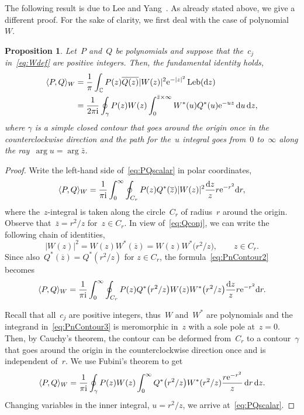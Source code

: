 \documentclass[pdftex]{sigma}
\numberwithin{equation}{section}
\newtheorem{Proposition}[Theorem]{Proposition}
\DeclareMathOperator{\Leb}{Leb}
\newcommand*{\Cset}{\mathbb{C}} %
\begin{document}
 The following result is due to Lee and Yang~\cite[Proposition 1]{LY2}. As already stated above, we give a different proof. For the sake of clarity, we first deal with the case of polynomial~$W$.

 \begin{Proposition}
 \label{prop:Contour1}
 Let~$P$ and~$Q$ be polynomials and suppose that the~$c_j$ in~\eqref{eq:Wdef} are positive integers.
 Then, the fundamental identity holds,
 \begin{align}
 \langle P, Q \rangle_W &= \frac{1}{\pi} \int_{\Cset} P(z) \overline{Q(z)} |W(z)|^2 {\rm e}^{-|z|^2} \Leb({\rm d}z)\nonumber \\
 & = \frac{1}{2\pi {\rm i}} \oint_{\gamma} P(z) W(z) \int_{0}^{\bar{z} \times \infty} W^*(u) Q^*(u) {\rm e}^{-uz}\, {\rm d}u\, {\rm d}z, \label{eq:PQscalar}
 \end{align}
 where $\gamma$ is a simple closed contour that goes around the origin once in the counterclockwise direction and the path for the~$u$ integral goes from~$0$ to~$\infty$ along the ray~$\arg u = \arg \bar{z}$.
 \end{Proposition}
 \begin{proof}
 Write the left-hand side of~\eqref{eq:PQscalar} in polar coordinates,
 \begin{equation}
 \label{eq:PnContour2}
 \langle P, Q\rangle_W =\frac{1}{\pi {\rm i}} \int_0^\infty \oint_{C_r} P(z) Q^*(\overline{z}) |W(z)|^2 \frac{{\rm d}z}{z} r {\rm e}^{-r^2} {\rm d}r,
 \end{equation}
 where the~$z$-integral is taken along the circle~$C_r$ of radius~$r$ around the origin. Observe that~$\overline{z} = r^2/z$ for~$z \in C_r$. In view of~\eqref{eq:Qconj}, we can write the following chain of identities,
 \begin{equation*}
 |W(z)|^2 = W(z) W^*(\overline{z}) = W(z) W^*\big(r^2/z\big), \qquad z \in C_r.
 \end{equation*}
 Since also~$Q^*(\overline{z}) = Q^*(r^2/z)$ for $z \in C_r$, the formula~\eqref{eq:PnContour2} becomes
 \begin{equation}
 \label{eq:PnContour3}
 \langle P, Q\rangle_W =\frac{1}{\pi {\rm i}} \int_0^\infty \oint_{C_r} P(z) Q^*\big(r^2/z\big) W(z) W^*\big(r^2/z\big) \frac{{\rm d}z}{z} r {\rm e}^{-r^2} {\rm d}r.
 \end{equation}

 Recall that all~$c_j$ are positive integers, thus~$W$ and~$W^*$ are polynomials and the integrand in~\eqref{eq:PnContour3} is	meromorphic in~$z$ with a sole pole at~$z=0$. Then, by Cauchy's	theorem, the contour can be deformed from~$C_r$ to a contour~$\gamma$ that goes around the origin in the counterclockwise direction once and is independent of~$r$. We use Fubini's theorem to get
 \begin{equation}
 \label{eq:PnContour4}
 \langle P, Q\rangle_W =\frac{1}{\pi {\rm i}} \oint_{\gamma} P(z)W(z) \int_0^\infty Q^*\big(r^2/z\big) W^*(r^2/z) \frac{r {\rm e}^{-r^2}}{z}\,{\rm d}r\, {\rm d}z.
 \end{equation}
 Changing variables in the inner integral, $u=r^2/z$, we arrive at~\eqref{eq:PQscalar}.
 \end{proof}
\end{document}
